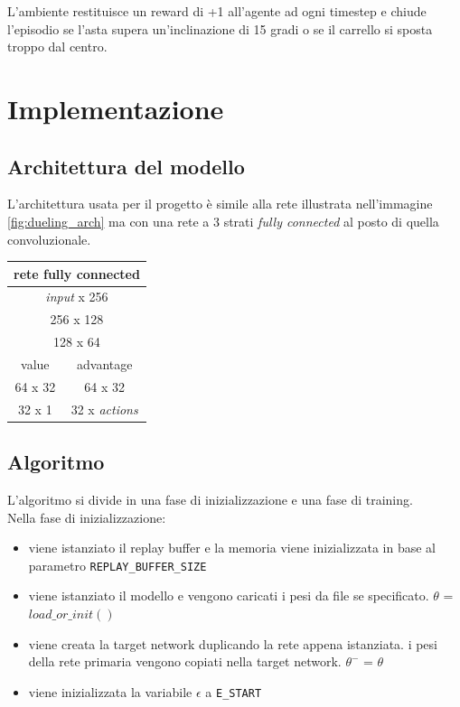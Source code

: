\documentclass{article}
\begin{document}
		L'ambiente restituisce un reward di +1 all'agente ad ogni timestep e chiude l'episodio se l'asta supera un'inclinazione di 15 gradi o se il carrello si sposta troppo dal centro.

	\section{Implementazione}
	\subsection{Architettura del modello}
		L'architettura usata per il progetto è simile alla rete illustrata nell'immagine \ref{fig:dueling_arch} ma con una rete a 3 strati \textit{fully connected} al posto di quella convoluzionale. \\

		\begin{tabular}{| c | c |}
			\hline
			\multicolumn{2}{|c|}{rete fully connected} \\
			\hline
			\multicolumn{2}{|c|}{\textit{input} x 256} \\
			\multicolumn{2}{|c|}{256 x 128} \\
			\multicolumn{2}{|c|}{128 x 64} \\
			\hline
			value & advantage \\
			\hline
			64 x 32 & 64 x 32 \\
			32 x 1 & 32 x \textit{actions} \\
			\hline
		\end{tabular}

	\subsection{Algoritmo}
		L'algoritmo si divide in una fase di inizializzazione e una fase di training. \\
		Nella fase di inizializzazione:
		\begin{itemize}
		\item viene istanziato il replay buffer e la memoria viene inizializzata in base al parametro \texttt{REPLAY\_BUFFER\_SIZE}
		\item viene istanziato il modello e vengono caricati i pesi da file se specificato. $\theta$ = $load\_or\_init()$
		\item viene creata la target network duplicando la rete appena istanziata. i pesi della rete primaria vengono copiati nella target network. $\theta^{-}$ = $\theta$
		\item viene inizializzata la variabile $\epsilon$ a \texttt{E\_START}
		\end{itemize}
\end{document}
